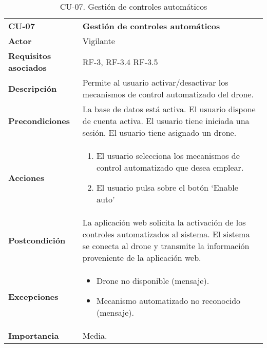 \begin{table}[H]
	\begin{center}
		\begin{tabular}{m{3cm} | m{10cm}}\hline
			\toprule
			\textbf{CU-07} & \textbf{Gestión de controles automáticos}\\
			\otoprule
			\textbf{Actor} & Vigilante\\
			\textbf{Requisitos asociados} & RF-3, RF-3.4 RF-3.5\\
			\textbf{Descripción} & Permite al usuario activar/desactivar los mecanismos de control automatizado del drone.\\
			\textbf{Precondiciones} & La base de datos está activa. El usuario dispone de cuenta activa. El usuario tiene iniciada una sesión. El usuario tiene asignado un drone.\\
			\textbf{Acciones} & \begin{enumerate}
											\item El usuario selecciona los mecanismos de control automatizado que desea emplear.
											\item El usuario pulsa sobre el botón `Enable auto'
											\end{enumerate}\\
											
			\textbf{Postcondición} & La aplicación web solicita la activación de los controles automatizados al sistema. El sistema se conecta al drone y transmite la información proveniente de la aplicación web.\\
			\textbf{Excepciones} & \begin{itemize}
												\item Drone no disponible (mensaje).
												\item Mecanismo automatizado no reconocido (mensaje).
												\end{itemize}\\
			\textbf{Importancia} & Media.\\
			\hline
			\bottomrule
		\end{tabular}
		\caption{CU-07. Gestión de controles automáticos}
		\label{tb:CU07}
	\end{center}
\end{table}



